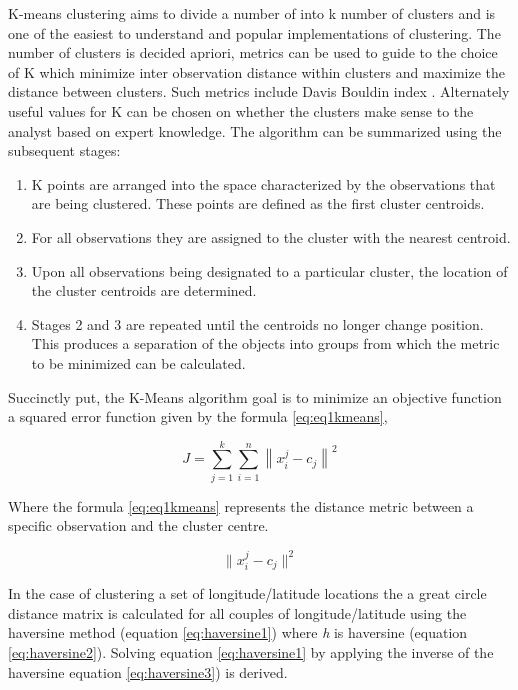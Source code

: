 K-means clustering aims to divide a number of into k number of clusters and is one of the easiest to understand and popular implementations of clustering. The number of clusters is decided apriori, metrics can be used to guide to the choice of K which minimize inter observation distance within clusters and maximize the distance between clusters. Such metrics include Davis Bouldin index \citep{davies1979cluster}. Alternately useful values for K can be chosen on whether the clusters make sense to the analyst based on expert knowledge. The algorithm can be summarized using the subsequent  stages:
\begin{enumerate}
\item K points are arranged into the space characterized by the observations that are being clustered. These points are defined as the first cluster centroids.
\item For all observations they are assigned to the cluster with the nearest centroid.
\item Upon all observations being designated to a particular cluster, the location of the cluster centroids are determined.
\item Stages 2 and 3 are repeated until the centroids no longer change position. This produces a separation of the objects into groups from which the metric to be minimized can be calculated.
\end{enumerate}
Succinctly put, the K-Means algorithm goal is to minimize an objective function a squared error function given by the formula \ref{eq:eq1kmeans}, 

\begin{equation} J=\sum_{j=1}^{k}\sum_{i=1}^{n}\left \| x_{i}^{j} - c_{j} \right \|^{2} \label{eq:eq1kmeans}  \end{equation}

Where the formula \ref{eq:eq1kmeans} represents the distance metric between a specific observation and the cluster centre. 

\begin{equation} \| x_{i}^{j} - c_{j} \|^{2}  \label{eq:eq2kmeans}  \end{equation}

In the case of clustering  a set of longitude/latitude locations the a great circle distance matrix is calculated for all couples of longitude/latitude using the haversine method (equation \ref{eq:haversine1}) where \textit{h} is haversine (equation \ref{eq:haversine2}). Solving equation \ref{eq:haversine1} by applying the inverse of the haversine equation \ref{eq:haversine3}) is derived.  

